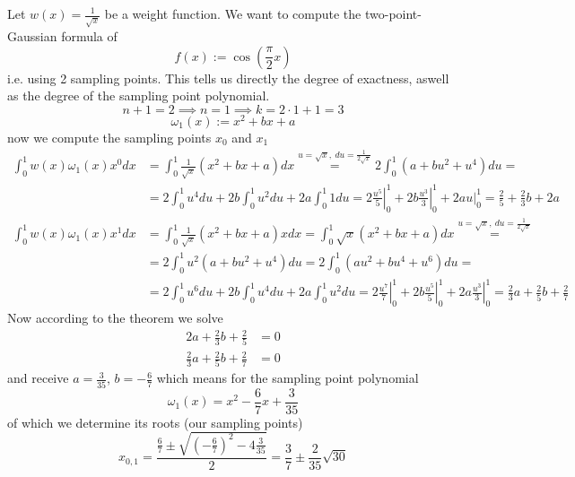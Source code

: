 \begin{example}
   Let \(w(x) = \frac{1}{\sqrt{x}}\) be a weight function.
   We want to compute the two-point-Gaussian formula of
   \[f(x) := \cos\left(\frac{\pi}{2} x\right)\]
   i.e. using 2 sampling points.
   This tells us directly the degree of exactness, aswell as the degree of the sampling point polynomial.
   \[n+1 = 2 \implies n = 1 \implies k = 2 \cdot 1 + 1 = 3\]
   \[\omega_1(x) := x^2 + bx + a\]
   now we compute the sampling points \(x_0\) and \(x_1\)
   \begin{equation*}
      \begin{split}
         \int_0^1 w(x) \omega_1(x) x^0 dx & = \int_0^1 \frac{1}{\sqrt{x}} (x^2 + bx + a) dx \overset{u = \sqrt{x},~du = \frac{1}{2\sqrt{x}}}{=} 2 \int_0^1 (a + bu^2 + u^4) du = \\
                                          & = 2 \int_0^1 u^4 du + 2b \int_0^1 u^2 du + 2a\int_0^1 1du = \left.2\frac{u^5}{5}\right\rvert_0^1 + \left.2b\frac{u^3}{3}\right\rvert_0^1 + 2au\rvert_0^1 = \frac{2}{5} + \frac{2}{3}b + 2a\\
         \int_0^1 w(x) \omega_1(x) x^1 dx & = \int_0^1 \frac{1}{\sqrt{x}} (x^2 + bx + a)x dx = \int_0^1 \sqrt{x} (x^2 + bx + a) dx \overset{u = \sqrt{x},~du = \frac{1}{2\sqrt{x}}}{=} \\
                                          & = 2 \int_0^1 u^2(a + bu^2 + u^4) du = 2 \int_0^1 (au^2 + bu^4 + u^6) du = \\
                                          & = 2\int_0^1 u^6 du + 2b \int_0^1 u^4 du + 2a \int_0^1 u^2du = \left.2 \frac{u^7}{7}\right\rvert_0^1 + \left. 2b\frac{u^5}{5}\right\rvert_0^1 + \left.2a\frac{u^3}{3}\right\rvert_0^1 = \frac{2}{3}a + \frac{2}{5}b + \frac{2}{7}
      \end{split}
   \end{equation*}
   Now according to the theorem we solve
   \begin{equation*}
      \begin{split}
         2a + \frac{2}{3}b + \frac{2}{5} & = 0\\
         \frac{2}{3}a + \frac{2}{5}b + \frac{2}{7} & = 0
      \end{split}
   \end{equation*}
   and receive \(a = \frac{3}{35}\), \(b = -\frac{6}{7}\) which means for the sampling point polynomial
   \[\omega_1(x) = x^2 - \frac{6}{7}x + \frac{3}{35}\]
   of which we determine its roots (our sampling points)
   \[x_{0,1} = \frac{\frac{6}{7} \pm \sqrt{\left(-\frac{6}{7}\right)^2 - 4 \frac{3}{35}}}{2} = \frac{3}{7} \pm \frac{2}{35} \sqrt{30}\]

\end{example}
